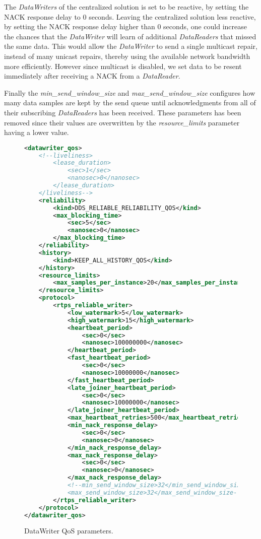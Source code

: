 \begin{itemize}
	The \textit{DataWriters} of the centralized solution is set to be reactive, by setting the NACK response delay to 0 seconds. Leaving the centralized solution less reactive, by setting the NACK response delay higher than 0 seconds, one could increase the chances that the \textit{DataWriter} will learn of additional \textit{DataReaders} that missed the same data. This would allow the \textit{DataWriter} to send a single multicast repair, instead of many unicast repairs, thereby using the available network bandwidth more efficiently. However since multicast is disabled, we set data to be resent immediately after receiving a NACK from a \textit{DataReader}. 
	
	Finally the \textit{min\_send\_window\_size} and \textit{max\_send\_window\_size} configures how many data samples are kept by the send queue until acknowledgments from all of their subscribing \textit{DataReaders} has been received. These parameters has been removed since their values are overwritten by the \textit{resource\_limits} parameter having a lower value.
\end{itemize}

\begin{figure}[!h]
\begin{lstlisting}[language=XML]
<datawriter_qos>
	<!--liveliness>
		<lease_duration>
			<sec>1</sec>
			<nanosec>0</nanosec>
		</lease_duration>
	</liveliness-->
	<reliability>
		<kind>DDS_RELIABLE_RELIABILITY_QOS</kind>
		<max_blocking_time>
			<sec>5</sec>
			<nanosec>0</nanosec>
		</max_blocking_time>
	</reliability>
	<history>
		<kind>KEEP_ALL_HISTORY_QOS</kind>
	</history>
	<resource_limits>
		<max_samples_per_instance>20</max_samples_per_instance>
	</resource_limits>
	<protocol>
		<rtps_reliable_writer>
			<low_watermark>5</low_watermark>
			<high_watermark>15</high_watermark>
			<heartbeat_period>
				<sec>0</sec>
				<nanosec>100000000</nanosec>
			</heartbeat_period>
			<fast_heartbeat_period>
				<sec>0</sec>
				<nanosec>10000000</nanosec>
			</fast_heartbeat_period>
			<late_joiner_heartbeat_period>
				<sec>0</sec>
				<nanosec>10000000</nanosec>
			</late_joiner_heartbeat_period>
			<max_heartbeat_retries>500</max_heartbeat_retries>
			<min_nack_response_delay>
				<sec>0</sec>
				<nanosec>0</nanosec>
			</min_nack_response_delay>
			<max_nack_response_delay>
				<sec>0</sec>
				<nanosec>0</nanosec>
			</max_nack_response_delay>
			<!--min_send_window_size>32</min_send_window_size>
			<max_send_window_size>32</max_send_window_size-->
		</rtps_reliable_writer>
	</protocol>
</datawriter_qos>
\end{lstlisting}
\caption[DataWriter QoS parameters]{
		\label{fig:writerQoS} 
		\footnotesize{DataWriter QoS parameters.}
	}
\end{figure}

